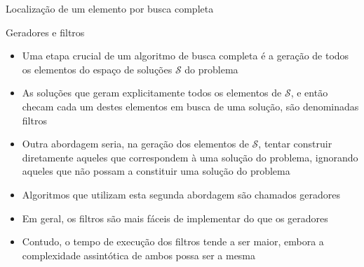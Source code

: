 \begin{frame}[fragile]{Localização de um elemento por busca completa}
\end{frame}

\begin{frame}[fragile]{Geradores e filtros}

    \begin{itemize}
        \item Uma etapa crucial de um algoritmo de busca completa é a geração de todos os elementos
            do espaço de soluções $\mathcal{S}$ do problema

        \item As soluções que geram explicitamente todos os elementos de $\mathcal{S}$, e 
            então checam
            cada um destes elementos em busca de uma solução, são denominadas filtros

        \item Outra abordagem seria, na geração dos elementos de $\mathcal{S}$, tentar construir diretamente
            aqueles que correspondem à uma solução do problema, ignorando aqueles que não
            possam a constituir uma solução do problema

        \item Algoritmos que utilizam esta segunda abordagem são chamados geradores

        \item Em geral, os filtros são mais fáceis de implementar do que os geradores

        \item Contudo, o tempo de execução dos filtros tende a ser maior, embora a complexidade
            assintótica de ambos possa ser a mesma
    \end{itemize}

\end{frame}


